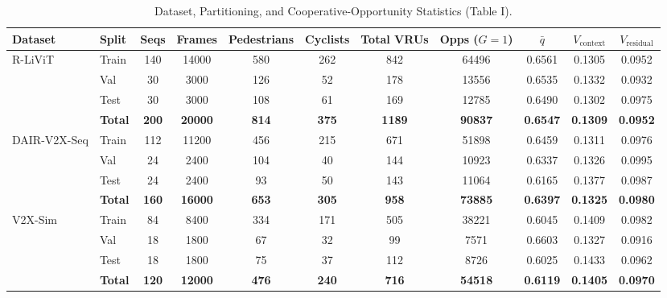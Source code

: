 \begin{table}[!t]
\caption{Dataset, Partitioning, and Cooperative-Opportunity Statistics (Table I).}
\label{tab:dataset_stats}
\centering
\small
\begin{tabular}{llccccccccc}
\toprule
Dataset & Split & Seqs & Frames & Pedestrians & Cyclists & Total VRUs & Opps ($G=1$) & $\bar{q}$ & $V_{\text{context}}$ & $V_{\text{residual}}$ \\
\midrule
R-LiViT & Train & 140 & 14000 & 580 & 262 & 842 & 64496 & 0.6561 & 0.1305 & 0.0952 \\
 & Val & 30 & 3000 & 126 & 52 & 178 & 13556 & 0.6535 & 0.1332 & 0.0932 \\
 & Test & 30 & 3000 & 108 & 61 & 169 & 12785 & 0.6490 & 0.1302 & 0.0975 \\
 & \textbf{Total} & \textbf{200} & \textbf{20000} & \textbf{814} & \textbf{375} & \textbf{1189} & \textbf{90837} & \textbf{0.6547} & \textbf{0.1309} & \textbf{0.0952} \\
\midrule
DAIR-V2X-Seq & Train & 112 & 11200 & 456 & 215 & 671 & 51898 & 0.6459 & 0.1311 & 0.0976 \\
 & Val & 24 & 2400 & 104 & 40 & 144 & 10923 & 0.6337 & 0.1326 & 0.0995 \\
 & Test & 24 & 2400 & 93 & 50 & 143 & 11064 & 0.6165 & 0.1377 & 0.0987 \\
 & \textbf{Total} & \textbf{160} & \textbf{16000} & \textbf{653} & \textbf{305} & \textbf{958} & \textbf{73885} & \textbf{0.6397} & \textbf{0.1325} & \textbf{0.0980} \\
\midrule
V2X-Sim & Train & 84 & 8400 & 334 & 171 & 505 & 38221 & 0.6045 & 0.1409 & 0.0982 \\
 & Val & 18 & 1800 & 67 & 32 & 99 & 7571 & 0.6603 & 0.1327 & 0.0916 \\
 & Test & 18 & 1800 & 75 & 37 & 112 & 8726 & 0.6025 & 0.1433 & 0.0962 \\
 & \textbf{Total} & \textbf{120} & \textbf{12000} & \textbf{476} & \textbf{240} & \textbf{716} & \textbf{54518} & \textbf{0.6119} & \textbf{0.1405} & \textbf{0.0970} \\
\bottomrule
\end{tabular}
\end{table}